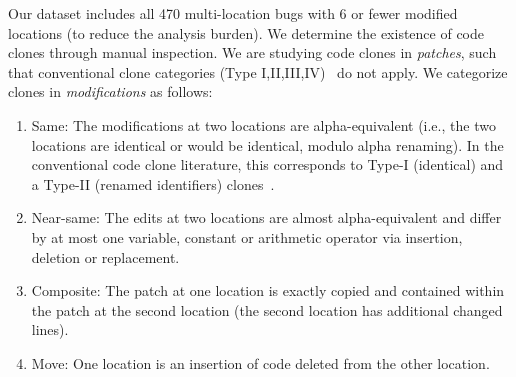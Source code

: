 \documentclass[10pt,journal,compsoc]{IEEEtran}
\begin{document}
Our dataset includes all 470 multi-location bugs with 6 or fewer modified
locations (to reduce the analysis burden). We determine the existence of code 
clones through manual inspection.
%
%
%
We are studying code clones in \emph{patches}, such that conventional clone categories (Type I,II,III,IV)~\cite{convcodeclone} do not apply. We categorize clones in \emph{modifications} as follows:
\begin{enumerate}
\item Same: The modifications at two locations are alpha-equivalent (i.e., the two locations are identical or would be
identical, modulo alpha renaming). In the conventional code clone literature,
this corresponds to Type-I (identical) and a Type-II (renamed identifiers) clones~\cite{JiaClones}.
\item Near-same: The edits at two locations are almost alpha-equivalent and
  differ by at most one variable, constant or arithmetic operator via insertion, deletion or replacement.
\item Composite: The patch at one location is exactly copied and contained within the patch at 
the 
second location (the second location  has additional changed lines).
\item Move: One location is an insertion of 
code deleted from the other location. 
\end{enumerate}
\end{document}
